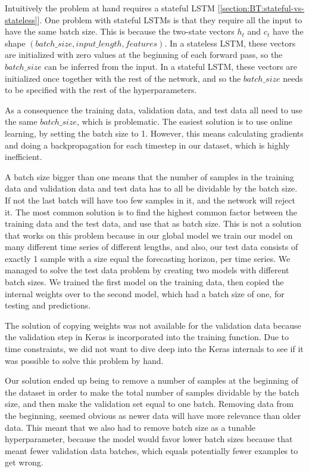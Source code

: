 Intuitively the problem at hand requires a stateful LSTM [\cref{section:BT:stateful-vs-stateless}].
One problem with stateful LSTMs is that they require all the input to have the same
batch size.
This is because the two-state vectors $h_t$ and $c_t$ have the shape
$(batch\_size, input\_length, features)$. In a stateless LSTM, these
vectors are initialized with zero values at the beginning of each forward pass,
so the $batch\_size$ can be inferred from the input.
In a stateful LSTM, these vectors are initialized once together with the rest
of the network, and so the $batch\_size$ needs to be specified with
the rest of the hyperparameters.

As a consequence the training data, validation data, and test data all
need to use the same $batch\_size$, which is problematic.
The easiest solution is to use online learning, by setting the batch size to 1.
However, this means calculating gradients and doing a backpropagation for each
timestep in our dataset, which is highly inefficient.

A batch size bigger than one means that the number of samples in
the training data and validation data and test data has to all be
dividable by the batch size. If not the last batch will have too few samples in it,
and the network will reject it.
The most common solution is to find the highest common factor
between the training data and the test data, and use that as batch size.
This is not a solution that works on this problem because in our global model
we train our model on many different time series of different lengths,
and
also, our test data consists of exactly 1 sample with a size equal the
forecasting horizon, per time series.
We managed to solve the test data problem by creating two models with
different batch sizes. We trained the first model on the training data,
then copied the internal weights over to the second model, which had a
batch size of one, for testing and
predictions.

The solution of copying weights was not available for the validation data
because the validation step in Keras is incorporated into the training function.
Due to time constraints, we did not want to dive deep into the Keras internals
to see if it was possible to solve this problem by hand.

Our solution ended up being to remove a number of samples at the beginning of
the dataset in order to make the total number of samples dividable by the batch size,
and then make the validation set equal to one batch. Removing data from the beginning,
seemed obvious as newer data will have more relevance than older data.
This meant that we also had to remove batch size as a tunable hyperparameter,
because the model would favor lower batch sizes because that meant fewer validation data batches,
which equals potentially fewer examples to get wrong.

